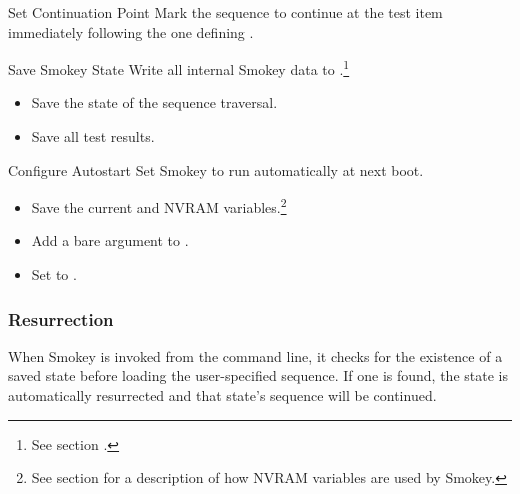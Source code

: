 \begin{Descriptive}

	\item[Set Continuation Point] Mark the sequence to continue at the test
	item immediately following the one defining .

	\item[Save Smokey State] Write all internal Smokey data to
	.\footnote{See section
	.}

	\begin{itemize}

		\item Save the state of the sequence traversal.

		\item Save all test results.

	\end{itemize}

	\item[Configure Autostart] Set Smokey to run automatically at next boot.

	\begin{itemize}

		\item Save the current  and
		 NVRAM variables.\footnote{See section
		 for a description of how NVRAM
		variables are used by Smokey.}

		\item Add a bare  argument to .

		\item Set  to .

	\end{itemize}

\end{Descriptive}

\subsubsection{Resurrection}

When Smokey is invoked from the command line, it checks for the existence of a
saved state before loading the user-specified sequence.  If one is found, the
state is automatically resurrected and that state's sequence will be continued.


